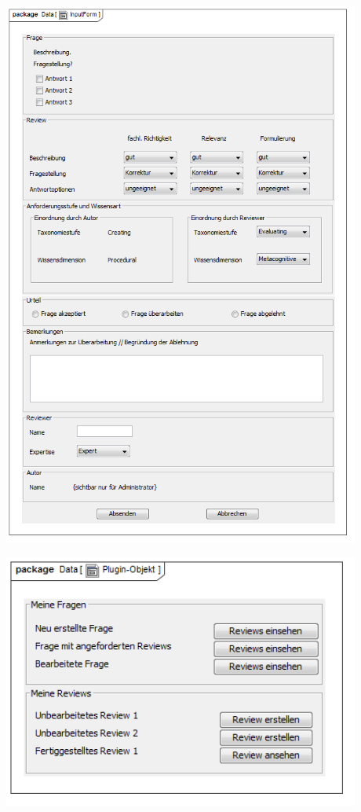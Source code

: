 \documentclass[a4paper]{scrreprt}
\begin{document}
\includegraphics[width=0.88\textwidth]{User_Interface_Modeling_Diagram__InputForm.png}
\label{Grafische Benutzeroberfläche}\newpage

\includegraphics[width=0.88\textwidth]{User_Interface_Modeling_Diagram__Plugin-Objekt.png}
\label{Grafische Benutzeroberfläche Review}
\end{document}
